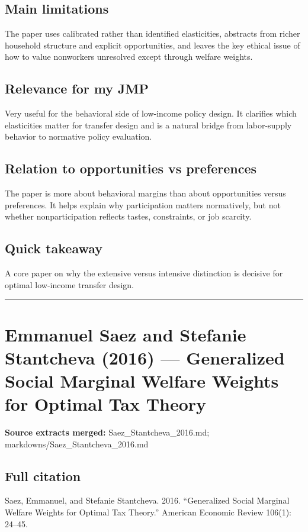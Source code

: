 \documentclass[11pt,a4paper]{article}
\begin{document}
\subsection*{Main limitations}
The paper uses calibrated rather than identified elasticities, abstracts from richer household structure and explicit opportunities, and leaves the key ethical issue of how to value nonworkers unresolved except through welfare weights.

\subsection*{Relevance for my JMP}
Very useful for the behavioral side of low-income policy design. It clarifies which elasticities matter for transfer design and is a natural bridge from labor-supply behavior to normative policy evaluation.

\subsection*{Relation to opportunities vs preferences}
The paper is more about behavioral margins than about opportunities versus preferences. It helps explain why participation matters normatively, but not whether nonparticipation reflects tastes, constraints, or job scarcity.

\subsection*{Quick takeaway}
A core paper on why the extensive versus intensive distinction is decisive for optimal low-income transfer design.


\medskip\hrule\medskip

\section*{Emmanuel Saez and Stefanie Stantcheva (2016) — Generalized Social Marginal Welfare Weights for Optimal Tax Theory}

\textbf{Source extracts merged:} Saez\_Stantcheva\_2016.md; markdowns/Saez\_Stantcheva\_2016.md

\subsection*{Full citation}
Saez, Emmanuel, and Stefanie Stantcheva. 2016. “Generalized Social Marginal Welfare Weights for Optimal Tax Theory.” American Economic Review 106(1): 24–45.
\end{document}
